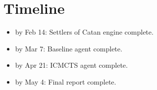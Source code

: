 \documentclass[a4paper, 11pt]{article}
\begin{document}
\section{Timeline}

\begin{itemize}
	\item by Feb 14: Settlers of Catan engine complete.
	\item by Mar 7: Baseline agent complete.
	\item by Apr 21: ICMCTS agent complete.
	\item by May 4: Final report complete.
\end{itemize}

\clearpage

\nocite{*}

\end{document}
